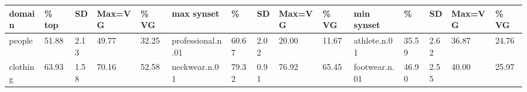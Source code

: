 \begin{table*}
\small
%
\begin{tabular}{lllllllllllllll}
\toprule
         domain &  \% top &    SD & Max=VG &   \% VG &         max synset &      \% &    SD & Max=VG &   \% VG &             min synset &      \% &    SD & Max=VG &   \% VG \\
\midrule
         people &  51.88 &  2.13 &  49.77 &  32.25 &  professional.n.01 &  60.67 &  2.02 &  20.00 &  11.67 &           athlete.n.01 &  35.59 &  2.62 &  36.87 &  24.76 \\
       clothing &  63.93 &  1.58 &  70.16 &  52.58 &      neckwear.n.01 &  79.32 &  0.91 &  76.92 &  65.45 &          footwear.n.01 &  46.90 &  2.55 &  40.00 &  25.97 \\

\end{tabular}
\end{table*}
